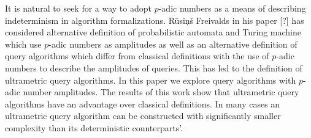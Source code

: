 \documentclass{llncs}
\begin{document}
It is natural to seek for a way to adopt $p$-adic  numbers as a means of describing indeterminism in algorithm formalizations. Rūsiņš Freivalds in his paper [?] has considered alternative definition of probabilistic automata and Turing machine which use $p$-adic numbers as amplitudes as well as an alternative definition of query algorithms which differ from classical definitions with the use of $p$-adic numbers to describe the amplitudes of queries. This has led to the definition of ultrametric query algorithms.
In this paper we explore query algorithms with $p$-adic number amplitudes. The results of this work show that ultrametric query algorithms have an advantage over classical definitions. In many cases an ultrametric query algorithm can be constructed with significantly smaller complexity than its deterministic counterparts'.
\end{document}
